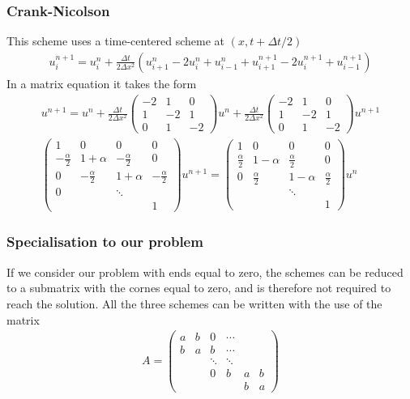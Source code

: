 \documentclass[11pt,a4paper,draft]{article}
\numberwithin{equation}{section}
\begin{document}
\subsubsection{Crank-Nicolson}
This scheme uses a time-centered scheme at $(x,t+\Delta t/2)$
\begin{gather}
u_i^{n+1} = u_i^n + \frac{\Delta t}{2\Delta x^2}\left(
u_{i+1}^n - 2u_i^n + u_{i-1}^n + u_{i+1}^{n+1} - 2u_i^{n+1} + u_{i-1}^{n+1}
\right)
\end{gather}
In a matrix equation it takes the form
\begin{gather}
u^{n+1} = u^n + \frac{\Delta t}{2\Delta x^2}
\begin{pmatrix}
-2 & 1 & 0\\
1 & -2 & 1\\
0 & 1 & -2
\end{pmatrix} u^n
 + \frac{\Delta t}{2\Delta x^2}
\begin{pmatrix}
-2 & 1 & 0\\
1 & -2 & 1\\
0 & 1 & -2
\end{pmatrix}u^{n+1}\\
\begin{pmatrix}
1 & 0 & 0 & 0\\
-\frac{\alpha}{2} & 1 + \alpha & -\frac{\alpha}{2} & 0\\
0 & -\frac{\alpha}{2} & 1 + \alpha & -\frac{\alpha}{2}\\
0 & & \ddots\\
&&& 1
\end{pmatrix}
u^{n+1} = 
\begin{pmatrix}
1 & 0 & 0 & 0\\
\frac{\alpha}{2} & 1 - \alpha & \frac{\alpha}{2} &  0\\
0 & \frac{\alpha}{2} & 1 - \alpha & \frac{\alpha}{2}\\
&& \ddots\\
&&&1
\end{pmatrix}u^n
\end{gather}


\subsubsection{Specialisation to our problem}

If we consider our problem with ends equal to zero, the schemes can 
be reduced to a submatrix with the cornes equal to zero, and is therefore
not required to reach the solution. All the three schemes can be written 
with the use of the matrix
\begin{gather}
A = 
\begin{pmatrix}
a & b & 0 & \cdots\\
b & a & b & \cdots\\
&&\ddots & \ddots\\
&&0& b& a & b\\
&&&&b&a
\end{pmatrix}
\label{eq:matrixA}
\end{gather}
\end{document}
